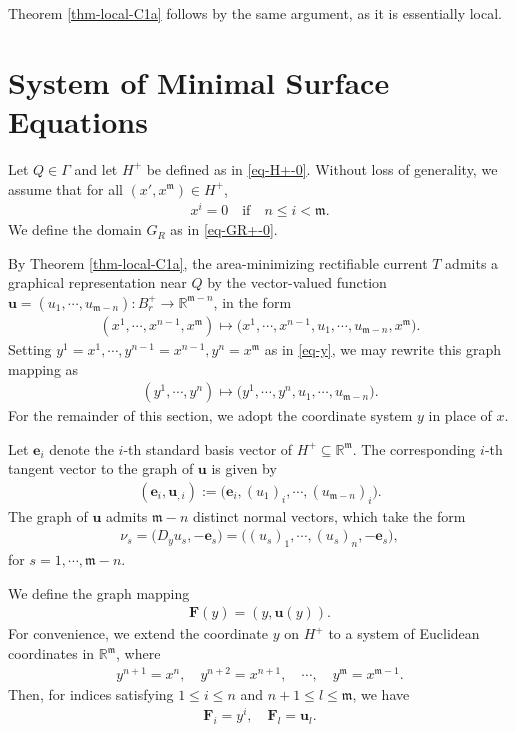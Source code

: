 \documentclass[11pt,reqno]{amsart}
\newcommand{\fm}{\mathfrak{m}}
\renewcommand{\leq}{\leqslant}
\theoremstyle{definition}
\numberwithin{equation}{section}
\begin{document}
Theorem \ref{thm-local-C1a} follows by the same argument, as it is essentially local.


\section{System of Minimal Surface Equations}\label{sec-PDE}

Let $Q\in \Gamma$ and let $H^+$ be defined as in \eqref{eq-H+-0}. Without loss of generality, we assume that for all $(x',x^\fm )\in H^+$,
\begin{align}
    x^i = 0 \quad \text{if} \quad n\leq i < \fm.
\end{align}
We define the domain $G_R$ as in
\eqref{eq-GR+-0}.

By Theorem \ref{thm-local-C1a}, the area-minimizing rectifiable current $T$ admits a graphical representation near $Q$ by the vector-valued function $\mathbf{u} = (u_1,\cdots,u_{\fm -n}): B^+_r \rightarrow \mathbb{R}^{\fm-n}$, in the form
\begin{align}
    (x^1,\cdots,x^{n-1},x^{\fm})\mapsto\bigl(x^1,\cdots,x^{n-1},u_1,\cdots,u_{\fm -n},x^{\fm}\bigr).
\end{align}
Setting $y^1=x^1,\cdots,y^{n-1}=x^{n-1},y^n=x^\fm$ as in \eqref{eq-y}, we may rewrite this graph mapping as
\begin{align}\label{eq-u-y}
    (y^1,\cdots,y^n)\mapsto \bigl(y^1,\cdots,y^n,u_1,\cdots,u_{\fm-n}\bigr).
\end{align}
For the remainder of this section, we adopt the coordinate system $y$ in place of $x$.

Let $\mathbf{e}_{i}$ denote the $i$-th standard basis vector of $H^+ \subseteq \mathbb{R}^\fm$. The corresponding $i$-th tangent vector to the graph of $\mathbf{u}$ is given by
\begin{align}
    (\mathbf{e}_{i}, \mathbf{u}_{,i}) := \bigl(\mathbf{e}_{i}, (u_1)_i, \cdots, (u_{\fm-n})_i\bigr).
\end{align}
The graph of $\mathbf{u}$ admits $\fm -n$ distinct normal vectors, which take the form
\begin{align}\label{eq-nu}
    \nu_s = \bigl(D_y u_s, -\mathbf{e}_{s}\bigr) = \bigl((u_s)_1, \cdots, (u_s)_{n}, -\mathbf{e}_{s}\bigr),
\end{align}
for $s=1, \cdots, \fm -n$.



We define the graph mapping
\begin{align}\label{eq-F}
    \mathbf{F}(y) = (y, \mathbf{u}(y)).
\end{align}
For convenience, we extend the coordinate $y$ on $H^+$ to a system of Euclidean coordinates in $\mathbb R^\fm$, where
\begin{align}\label{eq-Y}
    y^{n+1} = x^n, \quad y^{n+2} = x^{n+1}, \quad \cdots, \quad y^\fm = x^{\fm-1}.
\end{align}
Then, for indices satisfying $1\leq i\leq n$ and $n+1\leq l\leq \fm$, we have
\begin{align}
    \mathbf{F}_i = y^i, \quad \mathbf{F}_l = \mathbf{u}_l.
\end{align}
\end{document}
